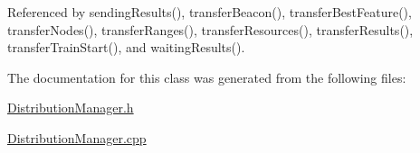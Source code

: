 Referenced by sending\+Results(), transfer\+Beacon(), transfer\+Best\+Feature(), transfer\+Nodes(), transfer\+Ranges(), transfer\+Resources(), transfer\+Results(), transfer\+Train\+Start(), and waiting\+Results().



The documentation for this class was generated from the following files\+:\begin{DoxyCompactItemize}
\item 
\hyperlink{DistributionManager_8h}{Distribution\+Manager.\+h}\item 
\hyperlink{DistributionManager_8cpp}{Distribution\+Manager.\+cpp}\end{DoxyCompactItemize}
